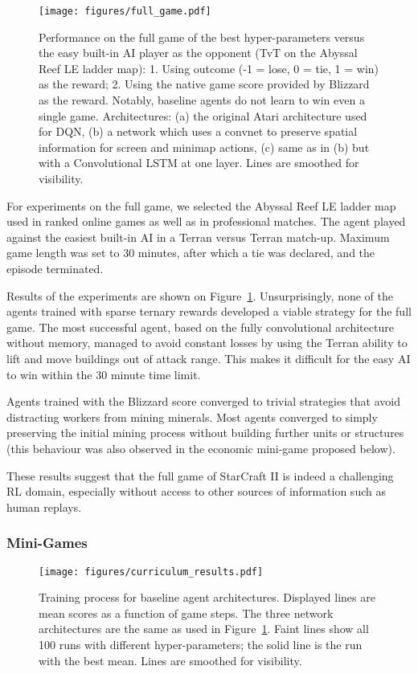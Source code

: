 \documentclass{article}
\begin{document}
\begin{figure}[ht]
    \centering
    \texttt{[image: figures/full\_game.pdf]}
    \caption{Performance on the full game of the best hyper-parameters versus the easy built-in AI player as the opponent (TvT on the Abyssal Reef LE ladder map): 1. Using outcome (-1 = lose, 0 = tie, 1 = win) as the reward; 2. Using the native game score provided by Blizzard as the reward.  Notably, baseline agents do not learn to win even a single game. Architectures: (a) the original Atari architecture used for DQN, (b) a network which uses a convnet to preserve spatial information for screen and minimap actions, (c) same as in (b) but with a Convolutional LSTM at one layer. Lines are smoothed for visibility.}
    \label{fig:fullgame}
\end{figure}

For experiments on the full game, we selected the Abyssal Reef LE ladder map used in ranked online games as well as in professional matches. 
The agent played against the easiest built-in AI in a Terran versus Terran match-up. Maximum game length was set to 30 minutes, after which a tie was declared, and the episode terminated.  

Results of the experiments are shown on Figure~\ref{fig:fullgame}. 
Unsurprisingly, none of the agents trained with sparse ternary rewards developed a viable strategy for the full game.
The most successful agent, based on the fully convolutional architecture without memory, managed to avoid constant losses by using the Terran ability to lift and move buildings out of attack range.  This makes it difficult for the easy AI to win within the 30 minute time limit.

Agents trained with the Blizzard score converged to trivial strategies that avoid distracting workers from mining minerals. 
Most agents converged to simply preserving the initial mining process without building further units or structures (this behaviour was also observed in the economic mini-game proposed below).

These results suggest that the full game of StarCraft II is indeed a challenging RL domain, especially without access to other sources of information such as human replays.

\subsubsection{Mini-Games}

\begin{figure}[ht!]
    \centering
    \texttt{[image: figures/curriculum\_results.pdf]}
    \caption{Training process for baseline agent architectures. 
    Displayed lines are mean scores as a function of game steps. 
    The three network architectures are the same as used in Figure~\ref{fig:fullgame}. Faint lines show all 100 runs with different hyper-parameters; the solid line is the run with the best mean.  Lines are smoothed for visibility.
    }
    \label{fig:minigames}
\end{figure}
\end{document}
